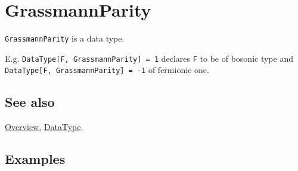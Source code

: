 \documentclass[../FeynCalcManual.tex]{subfiles}
\begin{document}
\hypertarget{grassmannparity}{%
\section{GrassmannParity}\label{grassmannparity}}

\texttt{GrassmannParity} is a data type.

E.g.
\texttt{DataType[\allowbreak{}F,\ \allowbreak{}GrassmannParity] = 1}
declares \texttt{F} to be of bosonic type and
\texttt{DataType[\allowbreak{}F,\ \allowbreak{}GrassmannParity] = -1} of
fermionic one.

\subsection{See also}

\hyperlink{toc}{Overview}, \hyperlink{datatype}{DataType}.

\subsection{Examples}
\end{document}
